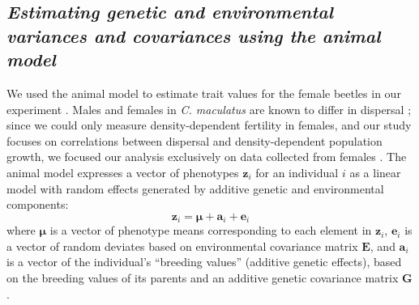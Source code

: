 \subsection{\textit{Estimating genetic and environmental variances and covariances using the animal model}}

We used the animal model to estimate trait values for the female beetles in our experiment \citep{lynch_genetics_1998,kruuk_estimating_2004,wilson_ecologists_2010}. Males and females in \textit{C. maculatus} are known to differ in dispersal \citep{miller_sex_2013,ochocki_rapid_2017}; since we could only measure density-dependent fertility in females, and our study focuses on correlations between dispersal and density-dependent population growth, we focused our analysis exclusively on data collected from females . The animal model expresses a vector of phenotypes $\bm{z}_{i}$ for an individual $i$ as a linear model with random effects generated by additive genetic and environmental components:
%
\begin{equation} \label{corr:animalmodel}
  \bm{z}_{i} = \bm{\mu} + \bm{a}_{i} + \bm{e}_{i}
\end{equation}
%
where $\bm{\mu}$ is a vector of phenotype means corresponding to each element in $\bm{z}_{i}$, $\bm{e}_{i}$ is a vector of random deviates based on environmental covariance matrix $\bm{E}$, and $\bm{a}_{i}$ is a vector of the individual's ``breeding values'' (additive genetic effects), based on the breeding values of its parents and an additive genetic covariance matrix $\bm{G}$.

